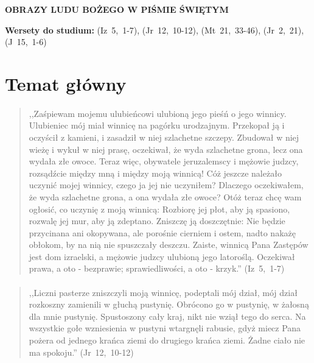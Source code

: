 \documentclass[10pt,a4paper,oneside]{article}
\begin{document}
\centerline{\textbf{\MakeUppercase{Obrazy Ludu Bożego w Piśmie Świętym}}}
\begin{center}
\textbf{Wersety do studium:} \mbox{(Iz 5, 1-7)}, \mbox{(Jr 12, 10-12)}, \mbox{(Mt 21, 33-46)}, \mbox{(Jr 2, 21)}, \mbox{(J 15, 1-6)}
\end{center}
\section{Temat główny}
\paragraph{}
\begin{quote}
,,Zaśpiewam mojemu ulubieńcowi ulubioną jego pieśń o jego winnicy. Ulubieniec mój miał winnicę na pagórku urodzajnym. Przekopał ją i oczyścił z kamieni, i zasadził w niej szlachetne szczepy. Zbudował w niej wieżę i wykuł w niej prasę, oczekiwał, że wyda szlachetne grona, lecz ona wydała złe owoce. Teraz więc, obywatele jeruzalemscy i mężowie judzcy, rozsądźcie między mną i między moją winnicą! Cóż jeszcze należało uczynić mojej winnicy, czego ja jej nie uczyniłem? Dlaczego oczekiwałem, że wyda szlachetne grona, a ona wydała złe owoce? Otóż teraz chcę wam ogłosić, co uczynię z moją winnicą: Rozbiorę jej płot, aby ją spasiono, rozwalę jej mur, aby ją zdeptano. Zniszczę ją doszczętnie: Nie będzie przycinana ani okopywana, ale porośnie cierniem i ostem, nadto nakażę obłokom, by na nią nie spuszczały deszczu. Zaiste, winnicą Pana Zastępów jest dom izraelski, a mężowie judzcy ulubioną jego latoroślą. Oczekiwał prawa, a oto - bezprawie; sprawiedliwości, a oto - krzyk.'' \mbox{(Iz 5, 1-7)}
\end{quote}
\paragraph{}
\begin{quote}
,,Liczni pasterze zniszczyli moją winnicę, podeptali mój dział, mój dział rozkoszny zamienili w głuchą pustynię. Obrócono go w pustynię, w żałosną dla mnie pustynię. Spustoszony cały kraj, nikt nie wziął tego do serca. Na wszystkie gołe wzniesienia w pustyni wtargnęli rabusie, gdyż miecz Pana pożera od jednego krańca ziemi do drugiego krańca ziemi. Żadne ciało nie ma spokoju.'' \mbox{(Jr 12, 10-12)}
\end{quote}
\end{document}
